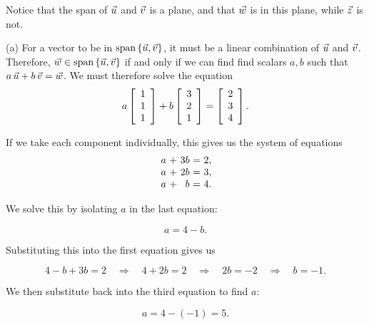 \documentclass{ximera}
\begin{document}
\begin{exploration}
\begin{example}
\begin{solution}
  Notice that the span of $\vect{u}$ and $\vect{v}$ is a plane, and that $\vect{w}$ is in this plane, while $\vect{z}$ is not.

\end{solution}

  \begin{solution}
    (a) For a vector to be in $\sspan\set{\vect{u},\vect{v}}$, it must
    be a linear combination of $\vect{u}$ and $\vect{v}$. Therefore,
    $\vect{w}\in\sspan\set{\vect{u},\vect{v}}$ if and only if we can
    find find scalars $a,b$ such that
    $a\,\vect{u} + b\,\vect{v} = \vect{w}$. We must therefore solve the
    equation
    \begin{equation*}
      a \startmat{r} 1 \\ 1 \\ 1 \stopmat
      + b \startmat{r} 3 \\ 2 \\ 1 \stopmat
      = \startmat{r} 2 \\ 3 \\ 4 \stopmat.
    \end{equation*}
   
    If we take each component individually, this gives us the system of equations
    \begin{equation*}
      \begin{array}{r@{~}c@{~}r@{~}c@{~}r@{~}r}
        a & + & 3b & = & 2, \\
        a & + & 2b & = & 3, \\
        a & + & b & = & 4.
      \end{array}
    \end{equation*}

    We solve this by isolating $a$ in the last equation: 

    \begin{equation*}
      a = 4 - b.
    \end{equation*}

    Substituting this into the first equation gives us

    \begin{equation*}
      4 - b + 3b = 2 \quad \Rightarrow \quad 4 + 2b = 2 \quad \Rightarrow \quad 2b = -2 \quad \Rightarrow \quad b = -1.
    \end{equation*}

    We then substitute back into the third equation to find $a$:

    \begin{equation*}
      a = 4 - (-1) = 5.
    \end{equation*}


\end{solution}
\end{example}
\end{exploration}
\end{document}
